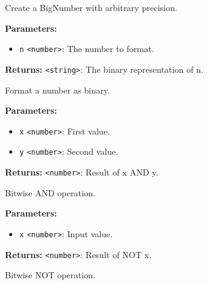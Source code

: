 \documentclass[12pt,a4paper]{article}
\begin{document}
\noindent Create a BigNumber with arbitrary precision.

\vspace{5mm}
\noindent {}


\noindent \textbf{Parameters:}
\begin{itemize}
  \item \texttt{n} \texttt{<number>}: The number to format.
\end{itemize}

\noindent \textbf{Returns:} \texttt{<string>}: The binary representation of \textasciigrave{}n\textasciigrave{}.

\noindent Format a number as binary.

\vspace{5mm}
\noindent {}


\noindent \textbf{Parameters:}
\begin{itemize}
  \item \texttt{x} \texttt{<number>}: First value.
  \item \texttt{y} \texttt{<number>}: Second value.
\end{itemize}

\noindent \textbf{Returns:} \texttt{<number>}: Result of \textasciigrave{}x AND y\textasciigrave{}.

\noindent Bitwise AND operation.

\vspace{5mm}
\noindent {}


\noindent \textbf{Parameters:}
\begin{itemize}
  \item \texttt{x} \texttt{<number>}: Input value.
\end{itemize}

\noindent \textbf{Returns:} \texttt{<number>}: Result of \textasciigrave{}NOT x\textasciigrave{}.

\noindent Bitwise NOT operation.

\vspace{5mm}
\noindent {}
\end{document}
